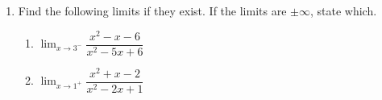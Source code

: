 \documentclass[12pt]{article}
\begin{document}
 
\begin{enumerate}
\item Find the following limits if they exist. If the limits are $\pm\infty$, state which.

\begin{enumerate}
    \item $\displaystyle\lim_{x\to 3^-} \dfrac{x^2-x-6}{x^2-5x+6}$
    \vfill

    \item $\displaystyle\lim_{x\to 1^+} \dfrac{x^2+x-2}{x^2-2x+1}$
    \vfill
\end{enumerate}

\end{enumerate}
\end{document}
